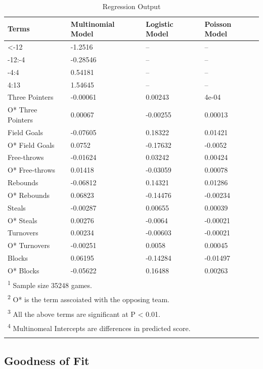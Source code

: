 \documentclass[
  man,floatsintext]{apa6}
\begin{document}
\begin{longtable}[t]{llll}
\caption{\label{tab:unnamed-chunk-5}Regression Output}\\
\toprule{}
Terms & Multinomial Model & Logistic Model & Poisson Model\\
\midrule{}
<-12 & -1.2516 & -- & --\\
-12:-4 & -0.28546 & -- & --\\
-4:4 & 0.54181 & -- & --\\
4:13 & 1.54645 & -- & --\\
Three Pointers & -0.00061 & 0.00243 & 4e-04\\
\addlinespace
O* Three Pointers & 0.00067 & -0.00255 & 0.00013\\
Field Goals & -0.07605 & 0.18322 & 0.01421\\
O* Field Goals & 0.0752 & -0.17632 & -0.0052\\
Free-throws & -0.01624 & 0.03242 & 0.00424\\
O* Free-throws & 0.01418 & -0.03059 & 0.00078\\
\addlinespace
Rebounds & -0.06812 & 0.14321 & 0.01286\\
O* Rebounds & 0.06823 & -0.14476 & -0.00234\\
Steals & -0.00287 & 0.00655 & 0.00039\\
O* Steals & 0.00276 & -0.0064 & -0.00021\\
Turnovers & 0.00234 & -0.00603 & -0.00021\\
\addlinespace
O* Turnovers & -0.00251 & 0.0058 & 0.00045\\
Blocks & 0.06195 & -0.14284 & -0.01497\\
O* Blocks & -0.05622 & 0.16488 & 0.00263\\
\bottomrule
\multicolumn{4}{l}{\rule{0pt}{1em}\textsuperscript{1} Sample size 35248 games.}\\
\multicolumn{4}{l}{\rule{0pt}{1em}\textsuperscript{2} O* is the term asscoiated with the opposing team.}\\
\multicolumn{4}{l}{\rule{0pt}{1em}\textsuperscript{3} All the above terms are significant at P < 0.01.}\\
\multicolumn{4}{l}{\rule{0pt}{1em}\textsuperscript{4} Multinomeal Intercepts are differences in predicted score.}\\{}
\end{longtable}

\hypertarget{goodness-of-fit}{%
\subsection{Goodness of Fit}\label{goodness-of-fit}}
\end{document}
